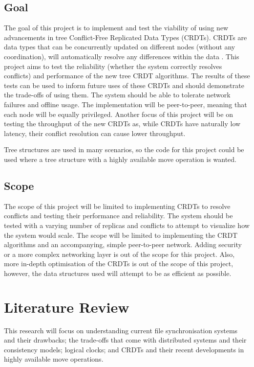 \documentclass[12pt]{report}
\begin{document}
\section{Goal}
The goal of this project is to implement and test the viability of using new advancements in tree Conflict-Free Replicated Data Types (CRDTs). CRDTs are data types that can be concurrently updated on different nodes (without any coordination), will automatically resolve any differences within the data \cite{10.1007/978-3-642-24550-3_29}. This project aims to test the reliability (whether the system correctly resolves conflicts) and performance of the new tree CRDT algorithms. The results of these tests can be used to inform future uses of these CRDTs and should demonstrate the trade-offs of using them. The system should be able to tolerate network failures and offline usage. The implementation will be peer-to-peer, meaning that each node will be equally privileged. Another focus of this project will be on testing the throughput of the new CRDTs as, while CRDTs have naturally low latency, their conflict resolution can cause lower throughput. \par
Tree structures are used in many scenarios, so the code for this project could be used where a tree structure with a highly available move operation is wanted.

\section{Scope}
The scope of this project will be limited to implementing CRDTs to resolve conflicts and testing their performance and reliability. The system should be tested with a varying number of replicas and conflicts to attempt to visualize how the system would scale. The scope will be limited to implementing the CRDT algorithms and an accompanying, simple peer-to-peer network. Adding security or a more complex networking layer is out of the scope for this project. Also, more in-depth optimisation of the CRDTs is out of the scope of this project, however, the data structures used will attempt to be as efficient as possible. \par

\newpage
\chapter{Literature Review}
This research will focus on understanding current file synchronisation systems and their drawbacks; the trade-offs that come with distributed systems and their consistency models; logical clocks; and CRDTs and their recent developments in highly available move operations.
\end{document}
